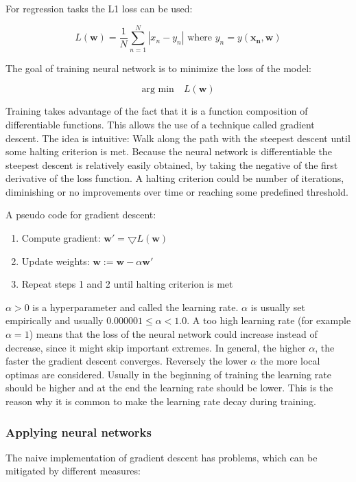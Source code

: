 \documentclass[draft,final,oneside]{vutinfth} %
\begin{document}
For regression tasks the L1 loss can be used:

\begin{equation}
L(\boldsymbol{w}) = \dfrac{1}{N} \sum_{n=1}^N |x_n - y_n| \text{ where } 
y_n = y(\boldsymbol{x_n}, \boldsymbol{w})
\end{equation}

The goal of training neural network is to minimize the loss of the model:

\begin{equation}
\text{arg min}\quad L(\boldsymbol{w})
\end{equation}

Training takes advantage of the fact that it is a function composition of differentiable functions. This allows the use of a technique called gradient descent. The idea is intuitive: Walk along the path with the steepest descent until some halting criterion is met. Because the neural network is differentiable the steepest descent is relatively easily obtained, by taking the negative of the first derivative of the loss function. A halting criterion could be number of iterations, diminishing or no improvements over time or reaching some predefined threshold.

A pseudo code for gradient descent:

\begin{enumerate}
\item Compute gradient: $\boldsymbol{w}' = \bigtriangledown	L(\boldsymbol{w})$
\item Update weights: $\boldsymbol{w} := \boldsymbol{w} - \alpha \boldsymbol{w}'$
\item Repeat steps 1 and 2 until halting criterion is met

\end{enumerate}

$\alpha > 0$ is a hyperparameter and called the learning rate. $\alpha$ is usually set empirically and usually $0.000001 \leq \alpha < 1.0$. A too high learning rate (for example $\alpha = 1$) means that the loss of the neural network could increase instead of decrease, since it might skip important extremes. In general, the higher $\alpha$, the faster the gradient descent converges. Reversely the lower $\alpha$ the more local optimas are considered. Usually in the beginning of training the learning rate should be higher and at the end the learning rate should be lower. This is the reason why it is common to make the learning rate decay during training.


\subsubsection{Applying neural networks}
The naive implementation of gradient descent has problems, which can be mitigated by different measures:
\end{document}
